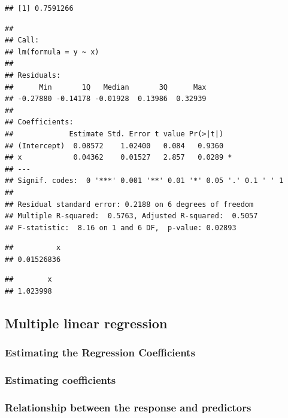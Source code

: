 \documentclass[]{article}
\begin{document}
\begin{verbatim}
## [1] 0.7591266
\end{verbatim}

\begin{verbatim}
## 
## Call:
## lm(formula = y ~ x)
## 
## Residuals:
##      Min       1Q   Median       3Q      Max 
## -0.27880 -0.14178 -0.01928  0.13986  0.32939 
## 
## Coefficients:
##             Estimate Std. Error t value Pr(>|t|)  
## (Intercept)  0.08572    1.02400   0.084   0.9360  
## x            0.04362    0.01527   2.857   0.0289 *
## ---
## Signif. codes:  0 '***' 0.001 '**' 0.01 '*' 0.05 '.' 0.1 ' ' 1
## 
## Residual standard error: 0.2188 on 6 degrees of freedom
## Multiple R-squared:  0.5763, Adjusted R-squared:  0.5057 
## F-statistic:  8.16 on 1 and 6 DF,  p-value: 0.02893
\end{verbatim}

\begin{verbatim}
##          x 
## 0.01526836
\end{verbatim}

\begin{verbatim}
##        x 
## 1.023998
\end{verbatim}

\hypertarget{multiple-linear-regression}{%
\subsection{Multiple linear
regression}\label{multiple-linear-regression}}

\hypertarget{estimating-the-regression-coefficients}{%
\subsubsection{Estimating the Regression
Coefficients}\label{estimating-the-regression-coefficients}}

\hypertarget{estimating-coefficients}{%
\subsubsection{Estimating coefficients}\label{estimating-coefficients}}

\hypertarget{relationship-between-the-response-and-predictors}{%
\subsubsection{Relationship between the response and
predictors}\label{relationship-between-the-response-and-predictors}}
\end{document}
